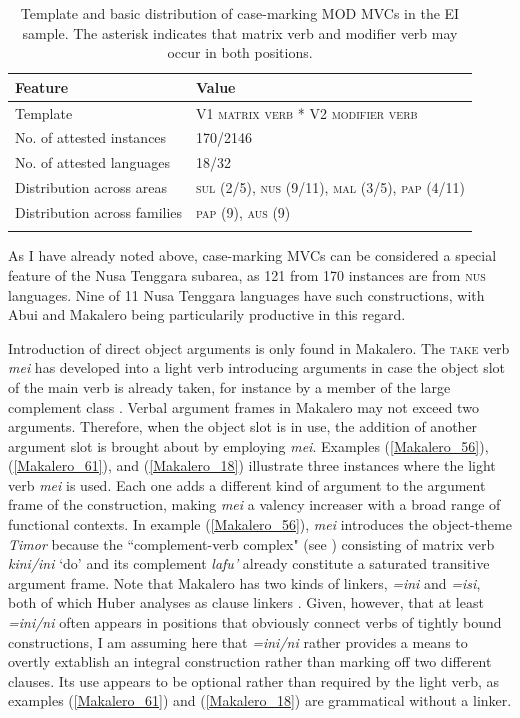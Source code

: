 \begin{table}
\begin{tabular}{ll}
\lsptoprule
Feature&Value\tabularnewline
\midrule
Template&V1 \textsc{matrix verb} * V2 \textsc{modifier verb}\tabularnewline
No. of attested instances& 170/2146 \tabularnewline
No. of attested languages& 18/32 \tabularnewline
Distribution across areas& \textsc{sul} (2/5), \textsc{nus} (9/11), \textsc{mal} (3/5), \textsc{pap} (4/11) \tabularnewline
Distribution across families& \textsc{pap} (9), \textsc{aus} (9) \tabularnewline
\lspbottomrule
\end{tabular}
\caption[Template and basic distribution of case-marking MOD MVCs]{Template and basic distribution of case-marking MOD MVCs in the EI sample. The asterisk indicates that matrix verb and modifier verb may occur in both positions.}
\label{table:case}
\end{table}

As I have already noted above, case-marking MVCs can be considered a special feature of the Nusa Tenggara subarea, as 121 from 170 instances are from \textsc{nus} languages. Nine of 11 Nusa Tenggara languages have such constructions, with Abui and Makalero being particularily productive in this regard.

Introduction of direct object arguments is only found in Makalero. The \textsc{take} verb \textit{mei} has developed into a light verb introducing arguments in case the object slot of the main verb is already taken, for instance by a member of the large complement class \citep[203f.]{huber2011}. Verbal argument frames in Makalero may not exceed two arguments. Therefore, when the object slot is in use, the addition of another argument slot is brought about by employing \textit{mei}. Examples (\ref{Makalero_56}), (\ref{Makalero_61}), and (\ref{Makalero_18}) illustrate three instances where the light verb \textit{mei} is used. Each one adds a different kind of argument to the argument frame of the construction, making \textit{mei} a valency increaser with a broad range of functional contexts. In example (\ref{Makalero_56}), \textit{mei} introduces the object-theme \textit{Timor} because the ``complement-verb complex" (see \citealt[131f.]{huber2011}) consisting of matrix verb \textit{kini/ini} `do' and its complement \textit{lafu'} already constitute a saturated transitive argument frame. Note that Makalero has two kinds of linkers, \textit{=ini} and \textit{=isi}, both of which Huber analyses as clause linkers \citep[457f.]{huber2011}. Given, however, that at least \textit{=ini/ni} often appears in positions that obviously connect verbs of tightly bound constructions, I am assuming here that \textit{=ini/ni} rather provides a means to overtly extablish an integral construction rather than marking off two different clauses. Its use appears to be optional rather than required by the light verb, as examples (\ref{Makalero_61}) and (\ref{Makalero_18}) are grammatical without a linker.

